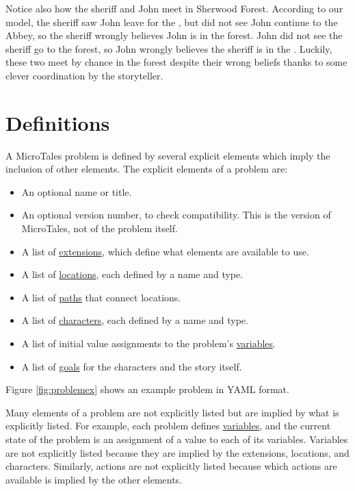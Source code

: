 \documentclass{nilreport}
\begin{document}
Notice also how the sheriff and John meet in Sherwood Forest. According to our model, the sheriff saw John leave for the , but did not see John continue to the Abbey, so the sheriff wrongly believes John is in the forest. John did not see the sheriff go to the forest, so John wrongly believes the sheriff is in the . Luckily, these two meet by chance in the forest despite their wrong beliefs thanks to some clever coordination by the storyteller.

\newpage

\section{Definitions}

A MicroTales problem is defined by several explicit elements which imply the inclusion of other elements. The explicit elements of a problem are:
\begin{itemize}
	\item An optional name or title.
	\item An optional version number, to check compatibility. This is the version of MicroTales, not of the problem itself.
	\item A list of \hyperref[sec:extensions]{extensions}, which define what elements are available to use.
	\item A list of \hyperref[sec:locations]{locations}, each defined by a name and type.
	\item A list of \hyperref[sec:locations]{paths} that connect locations.
	\item A list of \hyperref[sec:characters]{characters}, each defined by a name and type.
	\item A list of initial value assignments to the problem's \hyperref[sec:variables]{variables}.
	\item A list of \hyperref[sec:goals]{goals} for the characters and the story itself.
\end{itemize}

\noindent Figure \ref{fig:problemex} shows an example problem in YAML format.

Many elements of a problem are not explicitly listed but are implied by what is explicitly listed. For example, each problem defines \hyperref[sec:variables]{variables}, and the current state of the problem is an assignment of a value to each of its variables. Variables are not explicitly listed because they are implied by the extensions, locations, and characters. Similarly, actions are not explicitly listed because which actions are available is implied by the other elements.
\end{document}
